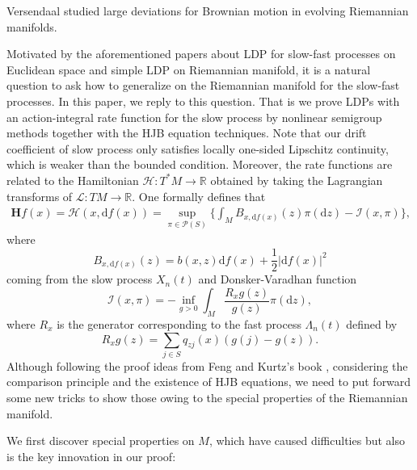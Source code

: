 \documentclass[a4paper]{article}
\numberwithin{equation}{section}
\theoremstyle{definition}
\begin{document}
Versendaal \cite{V2020} studied large deviations for Brownian motion in evolving Riemannian manifolds.
\par
Motivated by the aforementioned papers about LDP for slow-fast processes on Euclidean space and simple LDP on Riemannian manifold, it is a natural question to ask how to generalize on the Riemannian manifold for the slow-fast processes. In this paper, we reply to this question. That is we
prove LDPs with an action-integral rate function for the slow process by nonlinear semigroup methods together with the HJB equation techniques. Note that our drift coefficient of slow process only satisfies locally one-sided Lipschitz continuity, which is weaker than the bounded condition. Moreover, the rate functions are related to the Hamiltonian $\mathcal{H}:T^*M\to \mathbb{R}$ obtained by taking the Lagrangian transforms of $\mathcal{L}:TM\to \mathbb{R}$. One formally defines that
\begin{equation}\label{eqn_bfHH}
\begin{split}
	\mathbf{H}f(x)=\mathcal{H}(x,\mathrm{d}f(x))=\sup_{\pi\in\mathcal{P}(S)}\big\{\int_M B_{x,\mathrm{d}f(x)}(z)\pi(\text{d}z)-\mathcal{I}(x,\pi)\big\},
\end{split}
\end{equation}
where
\begin{equation*}
	B_{x,\mathrm{d}f(x)}(z)=b(x,z) \mathrm{d} f(x)+\frac{1}{2}
	\left|\mathrm{d}  f(x)\right|^2
\end{equation*}
coming from the slow process $X_n(t)$ and Donsker-Varadhan function
\begin{equation*}
	\mathcal{I}(x,\pi)=-\inf_{g>0}\int_M\frac{R_xg(z)}{g(z)}\pi(\text{d}z),
\end{equation*}
where $R_x$ is the generator corresponding to the fast process $\Lambda_n(t)$ defined by 
\begin{equation*}
	R_xg(z)=\sum_{j\in S }q_{zj}(x)\left(g(j)-g(z)\right).
\end{equation*}	
Although following the proof ideas from Feng and Kurtz’s book \cite{FK2006}, considering the comparison principle and the existence of HJB equations, we need to put forward some new tricks to show those owing to the special properties of the Riemannian manifold.
\par
We first discover special properties on $M$, which have caused difficulties but also is the key innovation in our proof:
\end{document}
